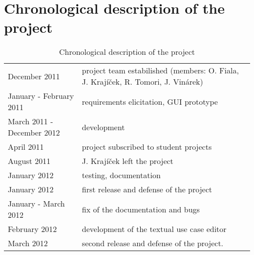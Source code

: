 \section{Chronological description of the project}

\begin{table}[ht]   %
\begin{center}
\begin{tabular}{ l p{7cm} }

December 2011 & project team estabilished (members: O. Fiala, J. Krajíček, R. Tomori, J. Vinárek)\\
January - February 2011 & requirements elicitation, GUI prototype\\
March 2011 - December 2012 & development\\
April 2011 & project subscribed to student projects\\
August 2011 & J. Krajíček left the project\\
January 2012 & testing, documentation\\
January 2012 & first release and defense of the project\\
January - March 2012 & fix of the documentation and bugs\\
February 2012 & development of the textual use case editor\\
March 2012 & second release and defense of the project.\\

\end{tabular}


\end{center}
\caption{Chronological description of the project}
\end{table}    
 